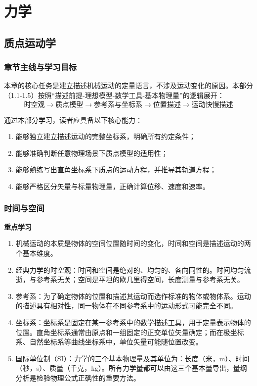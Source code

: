 \part{力学}
\chapter{质点运动学}
\newcommand{\vct}[1]{\boldsymbol{#1}}
\newcommand{\uve}[1]{\boldsymbol{\hat{#1}}}
\section{章节主线与学习目标}
本章的核心任务是建立描述机械运动的定量语言，不涉及运动变化的原因。本部分（1.1-1.5）按照“描述前提-理想模型-数学工具-基本物理量”的逻辑展开：
\[
\text{时空观} \rightarrow \text{质点模型} \rightarrow \text{参考系与坐标系} \rightarrow \text{位置描述} \rightarrow \text{运动快慢描述}
\]

通过本部分学习，读者应具备以下核心能力：
\begin{enumerate}[label=\arabic*.]
\item 能够独立建立描述运动的完整坐标系，明确所有约定条件；
\item 能够准确判断任意物理场景下质点模型的适用性；
\item 能够熟练写出直角坐标系下质点的运动方程，并推导其轨道方程；
\item 能够严格区分矢量与标量物理量，正确计算位移、速度和速率。
\end{enumerate}

\newpage

\section{时间与空间}
\textbf{重点学习}
\begin{enumerate}
\item 机械运动的本质是物体的空间位置随时间的变化，时间和空间是描述运动的两个基本维度。
\item 经典力学的时空观：时间和空间是绝对的、均匀的、各向同性的。时间均匀流逝，与参考系无关；空间是平坦的欧几里得空间，长度测量与参考系无关。
\item 参考系：为了确定物体的位置和描述其运动而选作标准的物体或物体系。运动的描述具有相对性，同一物体在不同参考系中的运动形式可能完全不同。
\item 坐标系：坐标系是固定在某一参考系中的数学描述工具，用于定量表示物体的位置。直角坐标系通常由原点和一组固定的正交单位矢量确定；而在极坐标系、自然坐标系等曲线坐标系中，单位矢量可能随位置改变。
\item 国际单位制（SI）：力学的三个基本物理量及其单位为：长度（米，m）、时间（秒，s）、质量（千克，kg）。所有力学量都可以由这三个基本量导出，量纲分析是检验物理公式正确性的重要方法。
\end{enumerate}

